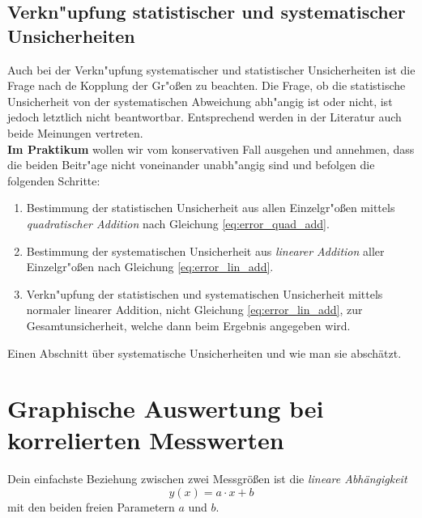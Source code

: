 \subsection{Verkn"upfung statistischer und systematischer Unsicherheiten}

Auch bei der Verkn"upfung systematischer und statistischer Unsicherheiten ist die Frage nach de Kopplung der Gr"o{\ss}en zu beachten. Die Frage, ob die statistische Unsicherheit von der systematischen Abweichung abh"angig ist oder nicht, ist jedoch letztlich nicht beantwortbar. Entsprechend werden in der Literatur auch beide Meinungen vertreten.\\

\noindent
\textbf{Im Praktikum} wollen wir vom konservativen Fall ausgehen und annehmen, dass die beiden Beitr"age nicht voneinander unabh"angig sind und befolgen die folgenden Schritte:
\begin{enumerate}
	\item Bestimmung der statistischen Unsicherheit aus allen Einzelgr"o{\ss}en mittels \textit{quadratischer Addition} nach Gleichung \ref{eq:error_quad_add}.
	\item Bestimmung der systematischen Unsicherheit aus \textit{linearer Addition} aller Einzelgr"o{\ss}en nach Gleichung \ref{eq:error_lin_add}.
	\item Verkn"upfung der statistischen und systematischen Unsicherheit mittels normaler linearer Addition, nicht Gleichung \ref{eq:error_lin_add}, zur Gesamtunsicherheit, welche dann beim Ergebnis angegeben wird.
\end{enumerate}
\begin{todo}
	Einen Abschnitt über systematische Unsicherheiten und wie man sie abschätzt.
\end{todo}

\section{Graphische Auswertung bei korrelierten Messwerten}

Dein einfachste Beziehung zwischen zwei Messgrößen ist die \textit{lineare Abhängigkeit}
\begin{equation}
	y(x) = a\cdot x + b
\end{equation}
mit den beiden freien Parametern $a$ und $b$.